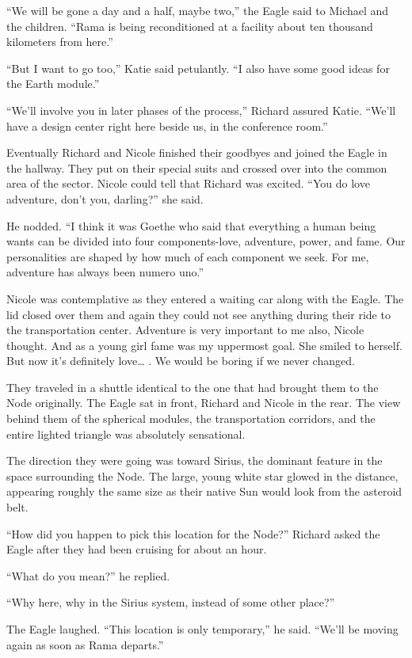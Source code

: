\documentclass[]{article}
\begin{document}
{“We will be gone a day and a half, maybe two,” the Eagle said to Michael and the children.  “Rama is being reconditioned at a facility about ten thousand kilometers from here.”

“But I want to go too,” Katie said petulantly.  “I also have some good ideas for the Earth module.”

“We’ll involve you in later phases of the process,” Richard assured Katie.  “We’ll have a design center right here beside us, in the conference room.”

Eventually Richard and Nicole finished their goodbyes and joined the Eagle in the hallway.  They put on their special suits and crossed over into the common area of the sector.  Nicole could tell that Richard was excited.  “You do love adventure, don’t you, darling?” she said.

He nodded.  “I think it was Goethe who said that everything a human being wants can be divided into four components-love, adventure, power, and fame.  Our personalities are shaped by how much of each component we seek.  For me, adventure has always been numero uno.”

Nicole was contemplative as they entered a waiting car along with the Eagle.  The lid closed over them and again they could not see anything during their ride to the transportation center.  Adventure is very important to me also, Nicole thought.  And as a young girl fame was my uppermost goal.  She smiled to herself.  But now it’s definitely love… .  We would be boring if we never changed.

They traveled in a shuttle identical to the one that had brought them to the Node originally.  The Eagle sat in front, Richard and Nicole in the rear.  The view behind them of the spherical modules, the transportation corridors, and the entire lighted triangle was absolutely sensational.

The direction they were going was toward Sirius, the dominant feature in the space surrounding the Node.  The large, young white star glowed in the distance, appearing roughly the same size as their native Sun would look from the asteroid belt.

“How did you happen to pick this location for the Node?” Richard asked the Eagle after they had been cruising for about an hour.

“What do you mean?” he replied.

“Why here, why in the Sirius system, instead of some other place?”

The Eagle laughed.  “This location is only temporary,” he said.  “We’ll be moving again as soon as Rama departs.”

}
\end{document}
